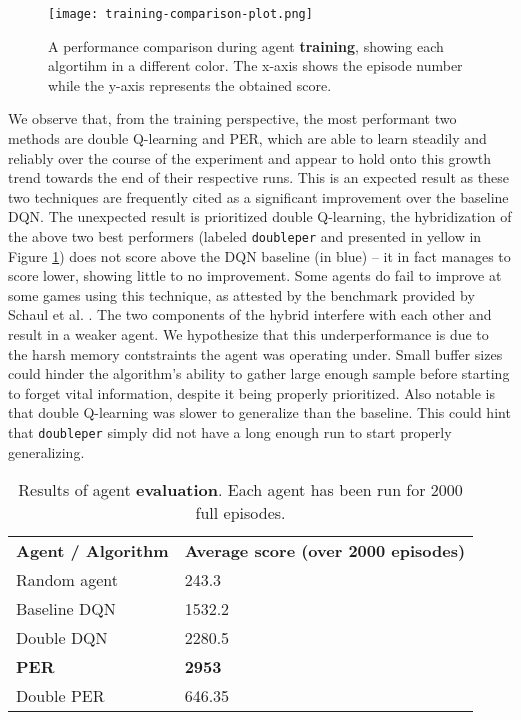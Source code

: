 \begin{figure}[h]
    \centering
    \texttt{[image: training-comparison-plot.png]}
    \caption{A performance comparison during agent \textbf{training}, showing each algortihm in a different color. The x-axis shows the episode number while the y-axis represents the obtained score.}
    \label{fig:training-results}
\end{figure}

We observe that, from the training perspective, the most performant two methods are double Q-learning and PER, which are able to learn steadily and reliably over the course of the experiment and appear to hold onto this growth trend towards the end of their respective runs.
This is an expected result as these two techniques are frequently cited as a significant improvement over the baseline DQN.
The unexpected result is prioritized double Q-learning, the hybridization of the above two best performers (labeled \texttt{doubleper} and presented in yellow in Figure \ref{fig:training-results}) does not score above the DQN baseline (in blue) -- it in fact manages to score lower, showing little to no improvement.
Some agents do fail to improve at some games using this technique, as attested by the benchmark provided by Schaul et al. \cite{per-paper}.
The two components of the hybrid interfere with each other and result in a weaker agent.
We hypothesize that this underperformance is due to the harsh memory contstraints the agent was operating under.
Small buffer sizes could hinder the algorithm's ability to gather large enough sample before starting to forget vital information, despite it being properly prioritized.
Also notable is that double Q-learning was slower to generalize than the baseline.
This could hint that \texttt{doubleper} simply did not have a long enough run to start properly generalizing.

\begin{table}
    \centering
        \begin{tabular}{ll}
            \textbf{Agent / Algorithm} & \textbf{Average score (over 2000 episodes)}   \\
            Random agent               & 243.3 \\
            Baseline DQN               & 1532.2 \\
            Double DQN                 & 2280.5 \\
            \textbf{PER}               & \textbf{2953} \\
            Double PER                 & 646.35 \\
        \end{tabular}%
        \caption{Results of agent \textbf{evaluation}. Each agent has been run for 2000 full episodes.}
    \label{tab:evaluation-results}
\end{table}

